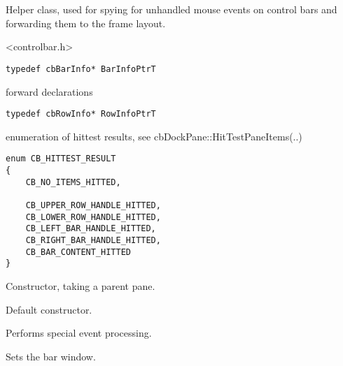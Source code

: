 %
%


\section{}\label{cbbarspy}


Helper class, used for spying for unhandled mouse events on control bars
and forwarding them to the frame layout.




<controlbar.h>


{\small \begin{verbatim}
typedef cbBarInfo* BarInfoPtrT
\end{verbatim}}
forward declarations

{\small \begin{verbatim}
typedef cbRowInfo* RowInfoPtrT
\end{verbatim}}
enumeration of hittest results, see cbDockPane::HitTestPaneItems(..)
\begin{verbatim}
enum CB_HITTEST_RESULT
{
    CB_NO_ITEMS_HITTED,

    CB_UPPER_ROW_HANDLE_HITTED,
    CB_LOWER_ROW_HANDLE_HITTED,
    CB_LEFT_BAR_HANDLE_HITTED,
    CB_RIGHT_BAR_HANDLE_HITTED,
    CB_BAR_CONTENT_HITTED
}
\end{verbatim}



\label{cbbarspycbbarspy}


Constructor, taking a parent pane.



Default constructor.


\label{cbbarspyprocessevent}


Performs special event processing.


\label{cbbarspysetbarwindow}


Sets the bar window.

